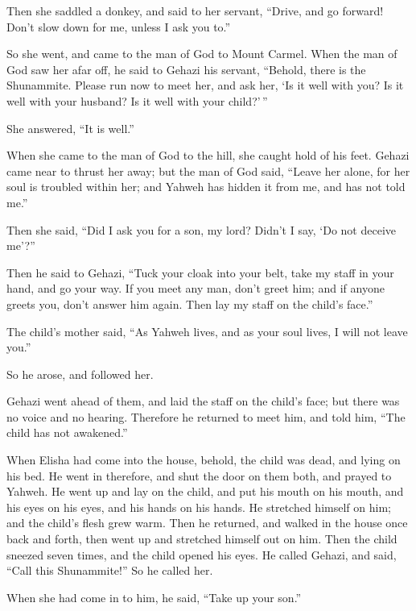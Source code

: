 \begin{paracol}{2}
\begin{otherlanguage}{english}
 Then she saddled a donkey, and said to her servant,
``Drive, and go forward! Don't slow down for me, unless I ask you to.''

 So she went, and came to the man of God to Mount Carmel.
When the man of God saw her afar off, he said to Gehazi his servant,
``Behold, there is the Shunammite.  Please run now to
meet her, and ask her, `Is it well with you? Is it well with your
husband? Is it well with your child?'\,''

She answered, ``It is well.''

 When she came to the man of God to the hill, she caught
hold of his feet. Gehazi came near to thrust her away; but the man of
God said, ``Leave her alone, for her soul is troubled within her; and
Yahweh has hidden it from me, and has not told me.''

 Then she said, ``Did I ask you for a son, my lord?
Didn't I say, `Do not deceive me'?''

 Then he said to Gehazi, ``Tuck your cloak into your
belt, take my staff in your hand, and go your way. If you meet any man,
don't greet him; and if anyone greets you, don't answer him again. Then
lay my staff on the child's face.''

 The child's mother said, ``As Yahweh lives, and as your
soul lives, I will not leave you.''

So he arose, and followed her.

 Gehazi went ahead of them, and laid the staff on the
child's face; but there was no voice and no hearing. Therefore he
returned to meet him, and told him, ``The child has not awakened.''

 When Elisha had come into the house, behold, the child
was dead, and lying on his bed.  He went in therefore,
and shut the door on them both, and prayed to Yahweh.  He
went up and lay on the child, and put his mouth on his mouth, and his
eyes on his eyes, and his hands on his hands. He stretched himself on
him; and the child's flesh grew warm.  Then he returned,
and walked in the house once back and forth, then went up and stretched
himself out on him. Then the child sneezed seven times, and the child
opened his eyes.  He called Gehazi, and said, ``Call this
Shunammite!'' So he called her.

When she had come in to him, he said, ``Take up your son.''


\end{otherlanguage}
\end{paracol}
